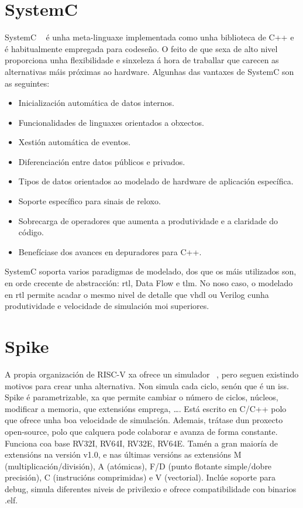 \section{SystemC}\label{sec:systemc}
SystemC ~\cite{systemc} é unha \gls{meta-linguaxe} implementada como unha biblioteca de C++ e é habitualmente empregada para codeseño. O feito de que sexa de alto nivel proporciona unha flexibilidade e sinxeleza á hora de traballar que carecen as alternativas máis próximas ao hardware. Algunhas das vantaxes de SystemC son as seguintes:

\begin{itemize}
    \item Inicialización automática de datos internos.
    \item Funcionalidades de linguaxes orientados a obxectos.
    \item Xestión automática de eventos.
    \item Diferenciación entre datos públicos e privados.
    \item Tipos de datos orientados ao modelado de hardware de aplicación específica.
    \item Soporte específico para sinais de reloxo.
    \item Sobrecarga de operadores que aumenta a produtividade e a claridade do código.
    \item Benefíciase dos avances en depuradores para C++.
\end{itemize}

SystemC soporta varios paradigmas de modelado, dos que os máis utilizados son, en orde crecente de abstracción: \acrfull{rtl}, Data Flow e \acrfull{tlm}. No noso caso, o modelado en \acrshort{rtl} permite acadar o mesmo nivel de detalle que \acrshort{vhdl} ou Verilog cunha produtividade e velocidade de simulación moi superiores.


\section{Spike}\label{sec:spike}
A propia organización de RISC-V xa ofrece un simulador ~\cite{sim_spike}, pero seguen existindo motivos para crear unha alternativa. Non simula cada ciclo, senón que é un \acrfull{iss}. Spike é parametrizable, xa que permite cambiar o número de ciclos, núcleos, modificar a memoria, que extensións emprega, \dots. Está escrito en C/C++ polo que ofrece unha boa velocidade de simulación. Ademais, trátase dun proxecto open-source, polo que calquera pode colaborar e  avanza de forma constante. Funciona coa base RV32I, RV64I, RV32E, RV64E. Tamén a gran maioría de extensións na versión v1.0, e nas últimas versións as extensións M (multiplicación/división), A (atómicas), F/D (punto flotante simple/dobre precisión), C (instrucións comprimidas) e V (vectorial). Inclúe soporte para debug, simula diferentes niveis de privilexio e ofrece compatibilidade con binarios .elf. 

